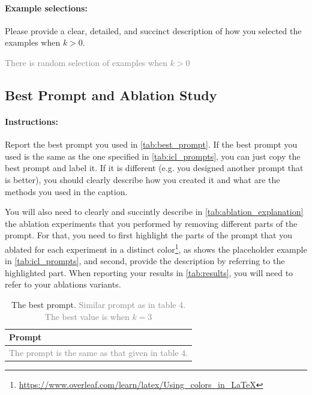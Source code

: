 \documentclass{article}
\begin{document}
\paragraph{Example selections:} Please provide a clear, detailed, and succinct description of how you selected the examples when $k > 0$.

\textcolor{gray}{There is random selection of examples when $k > 0$}



\newpage



\subsection{Best Prompt and Ablation Study}



\paragraph{Instructions:} Report the best prompt you used in \autoref{tab:best_prompt}.
If the best prompt you used is the same as the one specified in \autoref{tab:icl_prompts}, you can just copy the best prompt and label it.
If it is different (e.g. you designed another prompt that is better), you should clearly describe how you created it and what are the methods you used in the caption.

You will also need to clearly and succintly describe in \autoref{tab:ablation_explanation} the ablation experiments that you performed by removing different parts of the prompt.
For that, you need to first highlight the parts of the prompt that you ablated for each experiment in a distinct color\footnote{\url{https://www.overleaf.com/learn/latex/Using_colors_in_LaTeX}}, as shows the placeholder example in \autoref{tab:icl_prompts}, and second, provide the description by referring to the highlighted part.
When reporting your results in \autoref{tab:results}, you will need to refer to your ablations variants.



\begin{table}[h!]
\centering
\begin{tabular}{p{13.5cm}}
\toprule
\textbf{Prompt} \\
\midrule
   \textcolor{gray}{The prompt is the same as that given in table 4.} \\
\bottomrule
\end{tabular}
\caption{The best prompt.
{\textcolor{gray}{Similar prompt as in table 4. The best value is when $k = 3$}}
}
\label{tab:best_prompt}
\end{table}
\end{document}
